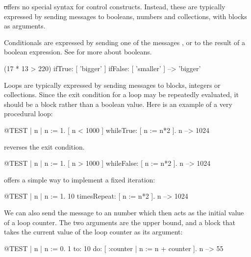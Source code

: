 \documentclass[a4paper,10pt,twoside]{book}
\begin{document}
\st offers no special syntax for control constructs.
Instead, these are typically expressed by sending messages to booleans, numbers and collections, with blocks as arguments.

Conditionals are expressed by sending one of the messages ,  or  to the result of a boolean expression. See  for more about booleans.

\begin{code}{}
(17 * 13 > 220)
   ifTrue: [ 'bigger' ]
   ifFalse: [ 'smaller' ] --> 'bigger'
\end{code}

Loops are typically expressed by sending messages to blocks, integers or collections.
Since the exit condition for a loop may be repeatedly evaluated, it should be a block rather than a boolean value.
Here is an example of a very procedural loop:

\begin{code}{@TEST | n |}
n := 1.
[ n < 1000 ] whileTrue: [ n := n*2 ].
n --> 1024
\end{code}

\noindent
{} reverses the exit condition.
\begin{code}{@TEST | n |}
n := 1.
[ n > 1000 ] whileFalse: [ n := n*2 ].
n --> 1024
\end{code}

\noindent
{} offers a simple way to implement a fixed iteration:

\begin{code}{@TEST | n |}
n := 1.
10 timesRepeat: [ n := n*2 ].
n --> 1024
\end{code}

We can also send the message  to an number which then acts as the initial value of a loop counter.
The two arguments are the upper bound, and a block that takes the current value of the loop counter as its argument:

\begin{code}{@TEST | n |}
n := 0.
1 to: 10 do: [ :counter | n := n + counter ].
n --> 55
\end{code}
\end{document}
